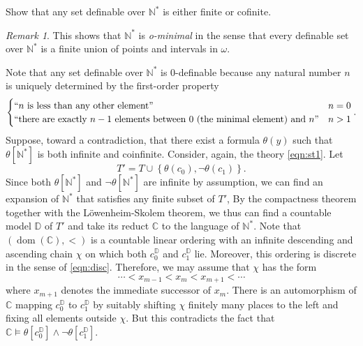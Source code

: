 \documentclass[10pt,letterpaper,cm]{nupset}
\theoremstyle{definition}
\theoremstyle{theorem}
\theoremstyle{remark}
\newtheorem*{remark}{Remark}
\newcommand{\C}{\mathbb C}
\newcommand{\D}{\mathbb D}
\newcommand{\N}{\mathbb N}
\newcommand{\1}{\mathbb{1}}
\newcommand{\0}{\vec 0}
\DeclareMathOperator{\dom}{dom}
\begin{document}
\begin{problem}[4.]
Show that any set definable over $\N^{\ast}$ is either finite or cofinite. 
\begin{remark}
This shows that $\N^{\ast}$ is \textit{o-minimal} in the sense that every definable set over $\N^{\ast}$ is a finite union of points and intervals in $\omega$. 
\end{remark}
\end{problem}
\begin{solution}
Note that any set definable over $\N^{\ast}$ is $0$-definable  because any natural number $n$ is uniquely determined by the first-order property
\[
\begin{cases}
 ``n \text{ is less than any other element}" & n=0
\\``\text{there are exactly }n-1\text{ elements between $0$ (the minimal element) and }n"  & n>1
\end{cases}.
\]
Suppose, toward a contradiction, that there exist a formula $\theta(y)$ such that $\theta\left[\N^{\ast}\right]$ is both infinite and coinfinite. Consider, again, the theory \eqref{eqn:st1}. Let $$T' = T \cup \left\{\theta(c_0), \neg{\theta(c_1)}\right\}.$$ Since both $\theta\left[\N^{\ast}\right]$ and $\neg{\theta\left[\N^{\ast}\right]}$ are infinite by assumption, we can find an expansion of $\N^{\ast}$ that satisfies any finite subset of $T'$, By the compactness theorem together with the L\"owenheim-Skolem theorem, we thus can find a countable model $\D$ of $T'$ and take its reduct $\C$ to the language of $\N^{\ast}$. Note that $\left(\dom(\C), < \right)$ is a countable linear ordering with an  infinite descending and ascending chain $\chi$ on which both $c_0^{\D}$ and $c_1^{\D}$ lie. Moreover, this ordering is discrete in the sense of \eqref{eqn:disc}.
Therefore, we may assume that $\chi$ has the form
\[
 \cdots < x_{m-1} < x_m < x_{m+1} < \cdots
\] where $x_{m+1}$ denotes the immediate successor of $x_m$. There is an automorphism of $\C$ mapping $c_0^{\D}$ to $c_1^{\D}$ by suitably shifting $\chi$ finitely many places to the left and fixing all elements outside $\chi$. But this contradicts the fact that $\C \models \theta\left[c_0^{\D}\right] \land \neg{\theta\left[c_1^{\D}\right]}$.
\end{solution}
\end{document}
